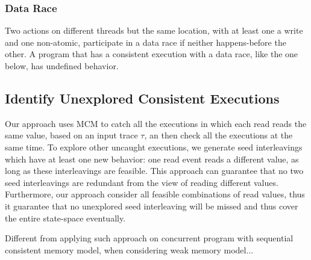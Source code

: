 \documentclass[preprint, numbers, 10pt]{sigplanconf}
\begin{document}
\subsubsection{Data Race}
Two actions on different threads but the same location, with at least 
one a write and one non-atomic, participate in a data race if neither 
happens-before the other. A program that has a consistent execution 
with a data race, like the one below, has undefined behavior.

\subsection{Identify Unexplored Consistent Executions}
\label{sec:identify}

Our approach uses MCM to catch all the executions in which each read
reads the same value, based on an input trace $\tau$, an then
check all the executions at the same time. 
To explore other uncaught executions, we generate seed interleavings
which have at least one new behavior: one read event reads a different
value, as long as these interleavings are feasible. This approach can guarantee
that no two seed interleavings are redundant from the view of reading 
different values. Furthermore, our approach consider all feasible combinations
of read values, thus it guarantee that no unexplored seed interleaving will
be missed and thus cover the entire state-space eventually. 

Different from applying such approach on concurrent program with sequential
consistent memory model, when considering weak memory model...








\end{document}
